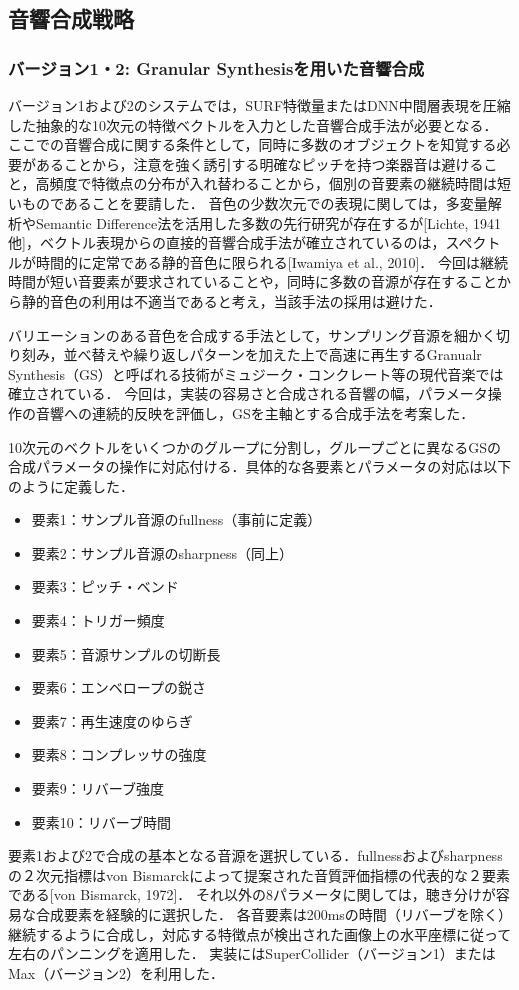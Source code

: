 \subsection{音響合成戦略}

\subsubsection{バージョン1・2: Granular Synthesisを用いた音響合成}
バージョン1および2のシステムでは，SURF特徴量またはDNN中間層表現を圧縮した抽象的な10次元の特徴ベクトルを入力とした音響合成手法が必要となる．
ここでの音響合成に関する条件として，同時に多数のオブジェクトを知覚する必要があることから，注意を強く誘引する明確なピッチを持つ楽器音は避けること，高頻度で特徴点の分布が入れ替わることから，個別の音要素の継続時間は短いものであることを要請した．
音色の少数次元での表現に関しては，多変量解析やSemantic Difference法を活用した多数の先行研究が存在するが[Lichte, 1941他]，ベクトル表現からの直接的音響合成手法が確立されているのは，スペクトルが時間的に定常である静的音色に限られる[Iwamiya et al., 2010]．
今回は継続時間が短い音要素が要求されていることや，同時に多数の音源が存在することから静的音色の利用は不適当であると考え，当該手法の採用は避けた．

バリエーションのある音色を合成する手法として，サンプリング音源を細かく切り刻み，並べ替えや繰り返しパターンを加えた上で高速に再生するGranualr Synthesis（GS）と呼ばれる技術がミュジーク・コンクレート等の現代音楽では確立されている．
今回は，実装の容易さと合成される音響の幅，パラメータ操作の音響への連続的反映を評価し，GSを主軸とする合成手法を考案した．

10次元のベクトルをいくつかのグループに分割し，グループごとに異なるGSの合成パラメータの操作に対応付ける．具体的な各要素とパラメータの対応は以下のように定義した．
\begin{itemize}
\item 要素1：サンプル音源のfullness（事前に定義）
\item 要素2：サンプル音源のsharpness（同上）
\item 要素3：ピッチ・ベンド
\item 要素4：トリガー頻度
\item 要素5：音源サンプルの切断長
\item 要素6：エンベロープの鋭さ
\item 要素7：再生速度のゆらぎ
\item 要素8：コンプレッサの強度
\item 要素9：リバーブ強度
\item 要素10：リバーブ時間
\end{itemize}
要素1および2で合成の基本となる音源を選択している．fullnessおよびsharpnessの２次元指標はvon Bismarckによって提案された音質評価指標の代表的な２要素である[von Bismarck, 1972]．
それ以外の8パラメータに関しては，聴き分けが容易な合成要素を経験的に選択した．
各音要素は200msの時間（リバーブを除く）継続するように合成し，対応する特徴点が検出された画像上の水平座標に従って左右のパンニングを適用した．
実装にはSuperCollider（バージョン1）またはMax（バージョン2）を利用した．


